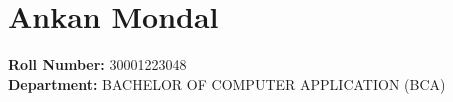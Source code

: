 \section*{Ankan Mondal}
\textbf{Roll Number:} 30001223048\\
\textbf{Department:} BACHELOR OF COMPUTER APPLICATION (BCA)

